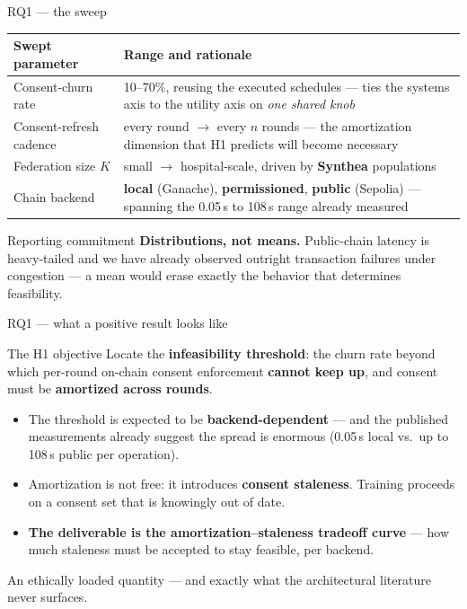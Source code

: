 \documentclass[aspectratio=169, 11pt]{beamer}
\newcommand{\hl}[1]{{\color{mCoral}\textbf{#1}}}
\begin{document}
\begin{frame}{RQ1 --- the sweep}
\begin{center}\small
\begin{tabular}{p{3.3cm}p{8.4cm}}
\toprule
\textbf{Swept parameter} & \textbf{Range and rationale}\\
\midrule
Consent-churn rate &
  10--70\%, reusing the executed schedules --- ties the systems axis to the
  utility axis on \emph{one shared knob}\\
\addlinespace
Consent-refresh cadence &
  every round $\rightarrow$ every $n$ rounds --- the amortization dimension
  that H1 predicts will become necessary\\
\addlinespace
Federation size $K$ &
  small $\rightarrow$ hospital-scale, driven by \textbf{Synthea} populations\\
\addlinespace
Chain backend &
  \textbf{local} (Ganache), \textbf{permissioned}, \textbf{public} (Sepolia)
  --- spanning the 0.05\,s to 108\,s range already measured\\
\bottomrule
\end{tabular}
\end{center}
\vspace{0.5em}
\begin{alertblock}{Reporting commitment}
\textbf{Distributions, not means.} Public-chain latency is heavy-tailed and we
have already observed outright transaction failures under congestion --- a
mean would erase exactly the behavior that determines feasibility.
\end{alertblock}
\end{frame}

\begin{frame}{RQ1 --- what a positive result looks like}
\begin{exampleblock}{The H1 objective}
Locate the \textbf{infeasibility threshold}: the churn rate beyond which
per-round on-chain consent enforcement \textbf{cannot keep up}, and consent
must be \textbf{amortized across rounds}.
\end{exampleblock}
\vspace{0.6em}
\begin{itemize}
\item The threshold is expected to be \textbf{backend-dependent} --- and the
      published measurements already suggest the spread is enormous
      (0.05\,s local vs.\ up to 108\,s public per operation).
\item Amortization is not free: it introduces \textbf{consent staleness}.
      Training proceeds on a consent set that is knowingly out of date.
\item \hl{The deliverable is the amortization--staleness tradeoff curve} ---
      how much staleness must be accepted to stay feasible, per backend.
\end{itemize}
\vspace{0.2em}
{\scriptsize An ethically loaded quantity --- and exactly what the
architectural literature never surfaces.}
\end{frame}
\end{document}
